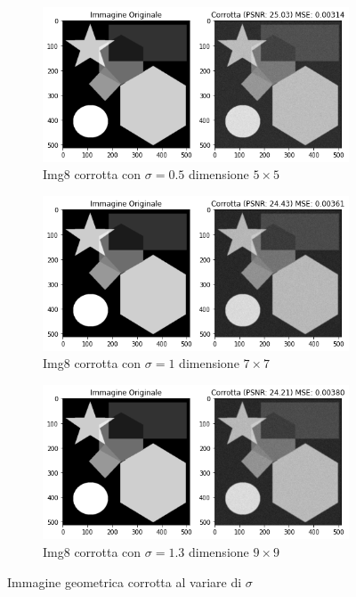 \begin{figure}[H]
    \centering
    \begin{subfigure}{0.6\textwidth}
        \centering
        \includegraphics[width=\textwidth]{imgRel/img8corrotto/img8corrotta5x5.png}
        \caption{Img8 corrotta con $\sigma = 0.5$ dimensione $5 \times 5$}
        \label{fig:8corrotto5}
    \end{subfigure}
    \begin{subfigure}{0.6\textwidth}
        \centering
        \includegraphics[width=\textwidth]{imgRel/img8corrotto/img8corrotta7x7.png}
        \caption{Img8 corrotta con $\sigma = 1$ dimensione $7\times 7$}
        \label{fig:8corrotto7}
    \end{subfigure}
    \begin{subfigure}{0.6\textwidth}
        \centering
        \includegraphics[width=\textwidth]{imgRel/img8corrotto/img8corrotta9x9.png}
        \caption{Img8 corrotta con $\sigma = 1.3$ dimensione $9 \times 9$}
        \label{fig:8corrotto9}
    \end{subfigure}
    \caption{Immagine geometrica corrotta al variare di $\sigma$}
    \label{fig:8corrotto}
\end{figure}
